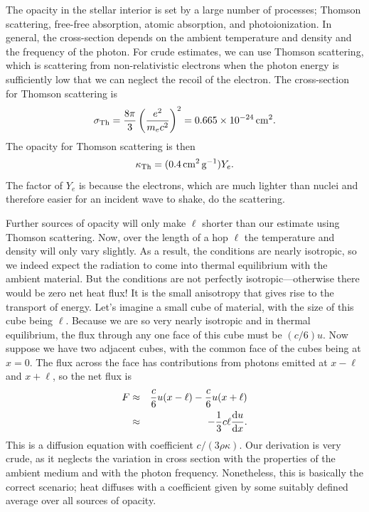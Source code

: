 The opacity in the stellar interior is set by a large number of processes; Thomson scattering, free-free absorption, atomic absorption, and photoionization.  In general, the cross-section depends on the ambient temperature and density and the frequency of the photon. For crude estimates, we can use Thomson scattering, which is scattering from non-relativistic electrons when the photon energy is sufficiently low that we can neglect the recoil of the electron.  The cross-section for Thomson scattering is 
\begin{equation}\label{e.Thomson-cross-section}
\sigma_{\mathrm{Th}} = \frac{8\pi}{3}\left(\frac{e^{2}}{m_{e}c^{2}}\right)^{2} = 0.665 \times 10^{-24} \,\mathrm{c}\mathrm{m}^{2}.
\end{equation}
The opacity for Thomson scattering is then
\[ \kappa_{\mathrm{Th}} = (0.4\,\mathrm{c}\mathrm{m}^{2}\,\mathrm{g}^{-1}) Y_{e}. \]
The factor of $Y_{e}$ is because the electrons, which are much lighter than nuclei and therefore easier for an incident wave to shake, do the scattering.

Further sources of opacity will only make $\ell$ shorter than our estimate using Thomson scattering.  Now, over the length of a hop $\ell$ the temperature and density will only vary slightly.  As a result, the conditions are nearly isotropic, so we indeed expect the radiation to come into thermal equilibrium with the ambient material.  But the conditions are not perfectly isotropic---otherwise there would be zero net heat flux!  It is the small anisotropy that gives rise to the transport of energy.  Let's imagine a small cube of material, with the size of this cube being $\ell$.  Because we are so very nearly isotropic and in thermal equilibrium, the flux through any one face of this cube must be $(c/6)u$.  Now suppose we have two adjacent cubes, with the common face of the cubes being at $x=0$.  The flux across the face has contributions from photons emitted at $x-\ell$ and $x+\ell$, so the net flux is
\begin{eqnarray}
	F &\approx& \frac{c}{6} u(x-\ell) - \frac{c}{6} u (x+\ell)\nonumber \\
	&\approx& -\frac{1}{3}c\ell\frac{\mathrm{d} u}{\mathrm{d} x}.\label{e.rad-diffusion-simple}
\end{eqnarray}
This is a diffusion equation with coefficient $c/(3\rho\kappa)$.  Our derivation is very crude, as it neglects the variation in cross section with the properties of the ambient medium and with the photon frequency.  Nonetheless, this is basically the correct scenario; heat diffuses with a coefficient given by some suitably defined average over all sources of opacity. 

